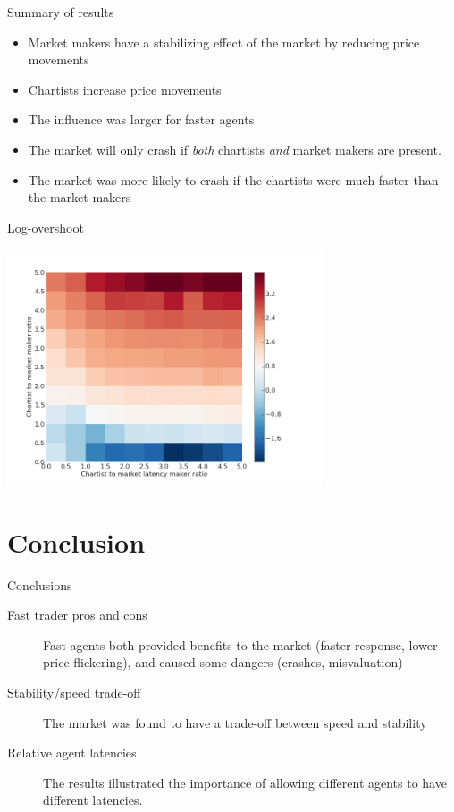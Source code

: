 \documentclass[14pt]{beamer}
\begin{document}
\begin{frame}{Summary of results}
\begin{itemize}
\item Market makers have a stabilizing effect of the market by reducing price movements
\item Chartists increase price movements
\item The influence was larger for faster agents
\item The market will only crash if \textit{both} chartists \textit{and} market makers are present.
\item The market was more likely to crash if the chartists were much faster than the market makers
\end{itemize}
\end{frame}

\begin{frame}{Log-overshoot}
\begin{center}
\includegraphics[width=0.7\textwidth]{ratio/overshoot_log.png}
\end{center}
\end{frame}


\section{Conclusion}
\begin{frame}
\tableofcontents[currentsection]
\end{frame}

\begin{frame}{Conclusions}
\begin{description}
\item[Fast trader pros and cons] Fast agents both provided benefits to the market (faster response, lower price flickering), and caused some dangers (crashes, misvaluation)
\item[Stability/speed trade-off] The market was found to have a trade-off between speed and stability
\item[Relative agent latencies] The results illustrated the importance of allowing different agents to have different latencies.
\end{description}
\end{frame}
\end{document}
